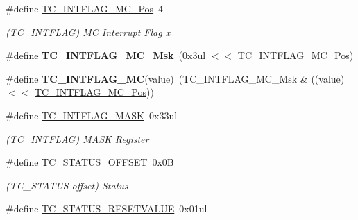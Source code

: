 \begin{DoxyCompactItemize}
\item 
\hypertarget{group___s_a_m_l21___t_c_ga7eda0335e2b1061545874dddc8591289}{}\#define \hyperlink{group___s_a_m_l21___t_c_ga7eda0335e2b1061545874dddc8591289}{T\+C\+\_\+\+I\+N\+T\+F\+L\+A\+G\+\_\+\+M\+C\+\_\+\+Pos}~4\label{group___s_a_m_l21___t_c_ga7eda0335e2b1061545874dddc8591289}

\begin{DoxyCompactList}\small\item\em (T\+C\+\_\+\+I\+N\+T\+F\+L\+A\+G) M\+C Interrupt Flag x \end{DoxyCompactList}\item 
\hypertarget{group___s_a_m_l21___t_c_ga9e739b0f2ce22bdabea977469ac28f19}{}\#define {\bfseries T\+C\+\_\+\+I\+N\+T\+F\+L\+A\+G\+\_\+\+M\+C\+\_\+\+Msk}~(0x3ul $<$$<$ T\+C\+\_\+\+I\+N\+T\+F\+L\+A\+G\+\_\+\+M\+C\+\_\+\+Pos)\label{group___s_a_m_l21___t_c_ga9e739b0f2ce22bdabea977469ac28f19}

\item 
\hypertarget{group___s_a_m_l21___t_c_ga66b13cc58e38d722d7728884a1cdfc7c}{}\#define {\bfseries T\+C\+\_\+\+I\+N\+T\+F\+L\+A\+G\+\_\+\+M\+C}(value)~(T\+C\+\_\+\+I\+N\+T\+F\+L\+A\+G\+\_\+\+M\+C\+\_\+\+Msk \& ((value) $<$$<$ \hyperlink{group___s_a_m_l21___t_c_ga7eda0335e2b1061545874dddc8591289}{T\+C\+\_\+\+I\+N\+T\+F\+L\+A\+G\+\_\+\+M\+C\+\_\+\+Pos}))\label{group___s_a_m_l21___t_c_ga66b13cc58e38d722d7728884a1cdfc7c}

\item 
\hypertarget{group___s_a_m_l21___t_c_gac69d1b7db4f432e95a7d497385267656}{}\#define \hyperlink{group___s_a_m_l21___t_c_gac69d1b7db4f432e95a7d497385267656}{T\+C\+\_\+\+I\+N\+T\+F\+L\+A\+G\+\_\+\+M\+A\+S\+K}~0x33ul\label{group___s_a_m_l21___t_c_gac69d1b7db4f432e95a7d497385267656}

\begin{DoxyCompactList}\small\item\em (T\+C\+\_\+\+I\+N\+T\+F\+L\+A\+G) M\+A\+S\+K Register \end{DoxyCompactList}\item 
\hypertarget{group___s_a_m_l21___t_c_ga6ee8f6868ff1bee322362b87dc53b1cc}{}\#define \hyperlink{group___s_a_m_l21___t_c_ga6ee8f6868ff1bee322362b87dc53b1cc}{T\+C\+\_\+\+S\+T\+A\+T\+U\+S\+\_\+\+O\+F\+F\+S\+E\+T}~0x0\+B\label{group___s_a_m_l21___t_c_ga6ee8f6868ff1bee322362b87dc53b1cc}

\begin{DoxyCompactList}\small\item\em (T\+C\+\_\+\+S\+T\+A\+T\+U\+S offset) Status \end{DoxyCompactList}\item 
\hypertarget{group___s_a_m_l21___t_c_ga625bca0b2ed050901611dafa81e0f922}{}\#define \hyperlink{group___s_a_m_l21___t_c_ga625bca0b2ed050901611dafa81e0f922}{T\+C\+\_\+\+S\+T\+A\+T\+U\+S\+\_\+\+R\+E\+S\+E\+T\+V\+A\+L\+U\+E}~0x01ul\label{group___s_a_m_l21___t_c_ga625bca0b2ed050901611dafa81e0f922}


\end{DoxyCompactItemize}

